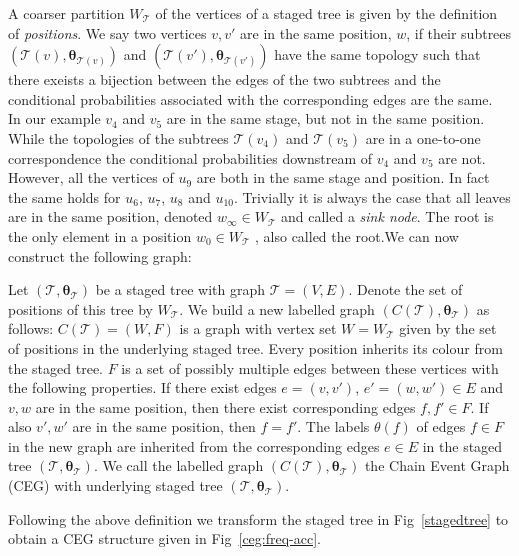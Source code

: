 \documentclass[runningheads]{llncs}
\begin{document}
A coarser partition $W_{\mathcal{T}}$ of the vertices of a staged tree is given by the definition of \emph{positions}. We say two vertices $v, v'$ are in the same position, $w$, if their subtrees $(\mathcal{T}(v), \boldsymbol{\theta}_{\mathcal{T}(v)})$ and $(\mathcal{T}(v'), \boldsymbol{\theta}_{\mathcal{T}(v')})$ have the same topology such that there exeists a bijection between the edges of the two subtrees and the conditional probabilities associated with the corresponding edges are the same. \\
In our example $v_4$ and $v_5$ are in the same stage, but not in the same position. While the topologies of the subtrees $\mathcal{T}(v_4)$ and $\mathcal{T}(v_5)$ are in a one-to-one correspondence the conditional probabilities downstream of $v_4$ and $v_5$ are not. 
However, all the vertices of $u_9$ are both in the same stage and position. In fact the same holds for $u_6$, $u_7$, $u_8$ and $u_{10}$.
Trivially it is always the case that all leaves are in the same position, denoted $w_\infty \in W_{\mathcal{T}}$ and called a \emph{sink node}. The root is the only element in a position $w_0 \in W_{\mathcal{T}}$ , also called the root.We can now construct the following graph:
\begin{definition}
Let $(\mathcal{T} , \boldsymbol{\theta}_{\mathcal{T}})$ be a staged tree with graph $\mathcal{T} = (V, E)$. Denote the set of positions of this tree by $W_{\mathcal{T}}$. We build a new labelled graph $(C(\mathcal{T}) , \boldsymbol{\theta}_{\mathcal{T}})$ as follows:
$C(\mathcal{T}) = (W, F)$ is a graph with vertex set $W = W_{\mathcal{T}}$ given by the set of positions in the underlying staged tree. Every position inherits its colour from the staged tree. $F$ is a set of possibly multiple edges between these vertices with the following properties. If there exist edges $e = (v, v')$, $e' = (w, w') \in E$ and $v, w$ are in the same position, then there exist corresponding edges $f, f' \in F$. If also $v', w'$ are in the same position, then $f = f'$. The labels $\theta(f)$ of edges $f \in F$ in the new graph are inherited from the corresponding edges $e \in E$ in the staged tree $(\mathcal{T} , \boldsymbol{\theta}_{\mathcal{T}})$.
We call the labelled graph $(C(\mathcal{T}) , \boldsymbol{\theta}_{\mathcal{T}})$ the Chain Event Graph (CEG) with underlying staged tree $(\mathcal{T} , \boldsymbol{\theta}_{\mathcal{T}})$.
\end{definition}
Following the above definition we transform the staged tree in Fig~\ref{stagedtree} to obtain a CEG structure given in Fig~\ref{ceg:freq-acc}. \\
\end{document}
